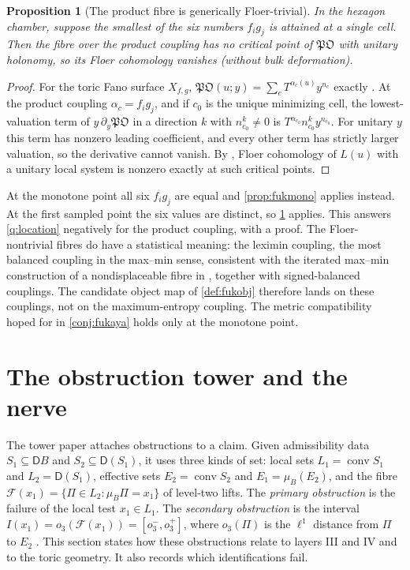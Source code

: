 \documentclass[11pt]{article}
\newtheorem{proposition}[theorem]{Proposition}
\theoremstyle{definition}
\theoremstyle{remark}
\newcommand{\D}{\mathsf{D}}
\begin{document}
\begin{proposition}[The product fibre is generically Floer-trivial]\label{prop:prodtrivial}
In the hexagon chamber, suppose the smallest of the six numbers $f_ig_j$ is attained at a single cell. Then the fibre over
the product coupling has no critical point of $\mathfrak{PO}$ with unitary holonomy, so its Floer cohomology vanishes
(without bulk deformation).
\end{proposition}
\begin{proof}
For the toric Fano surface $X_{f,g}$, $\mathfrak{PO}(u;y)=\sum_cT^{\alpha_c(u)}y^{n_c}$ exactly \cite{ChoOh2006}. At the product
coupling $\alpha_c=f_ig_j$, and if $c_0$ is the unique minimizing cell, the lowest-valuation term of $y\,\partial_y\mathfrak{PO}$ in a
direction $k$ with $n_{c_0}^k\ne0$ is $T^{\alpha_{c_0}}n_{c_0}^ky^{n_{c_0}}$. For unitary $y$ this term has nonzero leading
coefficient, and every other term has strictly larger valuation, so the derivative cannot vanish. By \cite{FOOO2010}, Floer
cohomology of $L(u)$ with a unitary local system is nonzero exactly at such critical points.
\end{proof}

At the monotone point all six $f_ig_j$ are equal and \cref{prop:fukmono} applies instead. At the first sampled point the
six values are distinct, so \cref{prop:prodtrivial} applies. This answers \cref{q:location} negatively for the product coupling, with a proof. The Floer-nontrivial fibres do have a statistical
meaning: the leximin coupling, the most balanced coupling in the max--min sense, consistent with the iterated max--min
construction of a nondisplaceable fibre in \cite{FOOO2010}, together with signed-balanced couplings. The candidate object
map of \cref{def:fukobj} therefore lands on these couplings, not on the maximum-entropy coupling. The metric
compatibility hoped for in \cref{conj:fukaya} holds only at the monotone point.

\section{The obstruction tower and the nerve}\label{sec:towernerve}

The tower paper \cite{Awasthi-Tower} attaches obstructions to a claim. Given admissibility data $S_1\subseteq\D B$ and
$S_2\subseteq\D(S_1)$, it uses three kinds of set: local sets $L_1=\operatorname{conv}S_1$ and $L_2=\D(S_1)$, effective sets
$E_2=\operatorname{conv}S_2$ and $E_1=\mu_B(E_2)$, and the fibre $\mathcal F(x_1)=\{\Pi\in L_2:\mu_B\Pi=x_1\}$ of level-two lifts.
The \emph{primary obstruction} is the failure of the local test $x_1\in L_1$. The \emph{secondary obstruction} is the interval
$I(x_1)=o_3(\mathcal F(x_1))=[o_3^-,o_3^+]$, where $o_3(\Pi)$ is the $\ell^1$ distance from $\Pi$ to $E_2$
\cite[Def.~10.11, Def.~10.14, Prop.~10.15]{Awasthi-Tower}. This section states how these obstructions relate to layers
III and IV and to the toric geometry. It also records which identifications fail.
\end{document}
